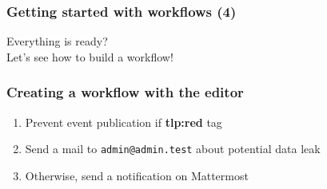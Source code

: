 \begin{frame}
    \frametitle{Getting started with workflows (4)}
    \centering
    {\Large Everything is ready?}\\
    \vspace*{3em}
    {\LARGE Let's see how to build a workflow!}
\end{frame}

\begin{frame}
    \frametitle{Creating a workflow with the editor}
    \begin{enumerate}
        \item Prevent event publication if \textbf{tlp:red} tag
        \item Send a mail to \texttt{admin@admin.test} about potential data leak
        \item Otherwise, send a notification on Mattermost
    \end{enumerate}
\end{frame}

